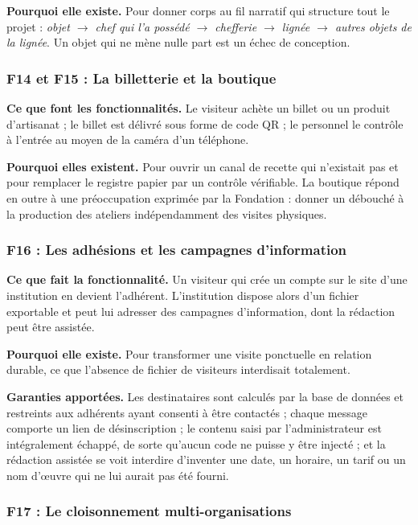 \textbf{Pourquoi elle existe.} Pour donner corps au fil narratif qui structure
tout le projet : \emph{objet $\rightarrow$ chef qui l'a possédé $\rightarrow$
chefferie $\rightarrow$ lignée $\rightarrow$ autres objets de la lignée}. Un
objet qui ne mène nulle part est un échec de conception.

\subsubsection{F14 et F15 : La billetterie et la boutique}

\textbf{Ce que font les fonctionnalités.} Le visiteur achète un billet ou un
produit d'artisanat ; le billet est délivré sous forme de code QR ; le personnel
le contrôle à l'entrée au moyen de la caméra d'un téléphone.

\textbf{Pourquoi elles existent.} Pour ouvrir un canal de recette qui n'existait
pas et pour remplacer le registre papier par un contrôle vérifiable. La boutique
répond en outre à une préoccupation exprimée par la Fondation : donner un
débouché à la production des ateliers indépendamment des visites physiques.

\subsubsection{F16 : Les adhésions et les campagnes d'information}

\textbf{Ce que fait la fonctionnalité.} Un visiteur qui crée un compte sur le
site d'une institution en devient l'adhérent. L'institution dispose alors d'un
fichier exportable et peut lui adresser des campagnes d'information, dont la
rédaction peut être assistée.

\textbf{Pourquoi elle existe.} Pour transformer une visite ponctuelle en
relation durable, ce que l'absence de fichier de visiteurs interdisait
totalement.

\textbf{Garanties apportées.} Les destinataires sont calculés par la base de
données et restreints aux adhérents ayant consenti à être contactés ; chaque
message comporte un lien de désinscription ; le contenu saisi par
l'administrateur est intégralement échappé, de sorte qu'aucun code ne puisse y
être injecté ; et la rédaction assistée se voit interdire d'inventer une date,
un horaire, un tarif ou un nom d'œuvre qui ne lui aurait pas été fourni.

\subsubsection{F17 : Le cloisonnement multi-organisations}

